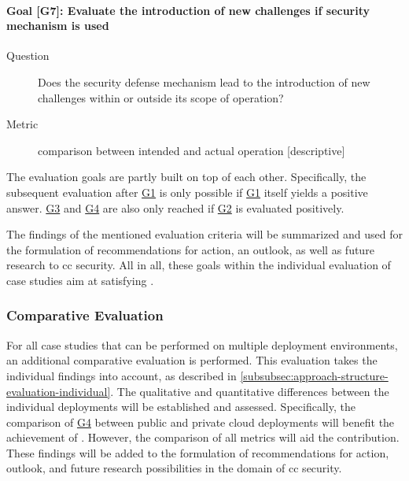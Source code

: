 {		
		\paragraph{Goal [G7]: \textbf{Evaluate the introduction of new challenges if security mechanism is used}\label{g7}}
		
		\begin{description}
			\item[Question] Does the security defense mechanism lead to the introduction of new challenges within or outside its scope of operation?
			\item[Metric] comparison between intended and actual operation [descriptive] \\
		\end{description}
		
		The evaluation goals are partly built on top of each other. Specifically, the subsequent evaluation after \hyperref[g1]{G1} is only possible if \hyperref[g1]{G1} itself yields a positive answer. \hyperref[g3]{G3} and \hyperref[g4]{G4} are also only reached if \hyperref[g2]{G2} is evaluated positively.
		
		The findings of the mentioned evaluation criteria will be summarized and used for the formulation of recommendations for action, an outlook, as well as future research to \ac{cc} security. All in all, these goals within the individual evaluation of case studies aim at satisfying .	
		
		\subsubsection{Comparative Evaluation} \label{subsubsec:approach-structure-evaluation-comparative}
		
		For all case studies that can be performed on multiple deployment environments, an additional comparative evaluation is performed. This evaluation takes the individual findings into account, as described in \autoref{subsubsec:approach-structure-evaluation-individual}. The qualitative and quantitative differences between the individual deployments will be established and assessed. Specifically, the comparison of \hyperref[g4]{G4} between public and private cloud deployments will benefit the achievement of . However, the comparison of all metrics will aid the contribution. These findings will be added to the formulation of recommendations for action, outlook, and future research possibilities in the domain of \ac{cc} security. \\\
		
}
